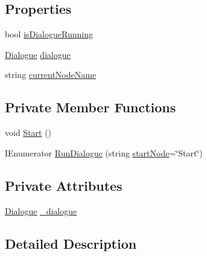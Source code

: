 \subsection*{Properties}
\begin{DoxyCompactItemize}
\item 
bool \hyperlink{a00037_a9eb0fd7b600a4667595042832af1d655}{is\-Dialogue\-Running}
\item 
\hyperlink{a00036}{Dialogue} \hyperlink{a00037_a4f9712a847ca6d53ec8d2dd64dfcffd8}{dialogue}
\item 
string \hyperlink{a00037_a8589c66769e89906eaff3c2263bdad5d}{current\-Node\-Name}
\end{DoxyCompactItemize}
\subsection*{Private Member Functions}
\begin{DoxyCompactItemize}
\item 
void \hyperlink{a00037_a18eb3750a0161dbfc20d7eb39e151b6c}{Start} ()
\item 
I\-Enumerator \hyperlink{a00037_adf4e816844b7d9ab4ed99265fd3f3ea9}{Run\-Dialogue} (string \hyperlink{a00037_a61c92b8d2228d01d8ac123b73bbb41a0}{start\-Node}=\char`\"{}Start\char`\"{})
\end{DoxyCompactItemize}
\subsection*{Private Attributes}
\begin{DoxyCompactItemize}
\item 
\hyperlink{a00036}{Dialogue} \hyperlink{a00037_a822055443227d3b76c6a8fb509812820}{\-\_\-dialogue}
\end{DoxyCompactItemize}


\subsection{Detailed Description}


